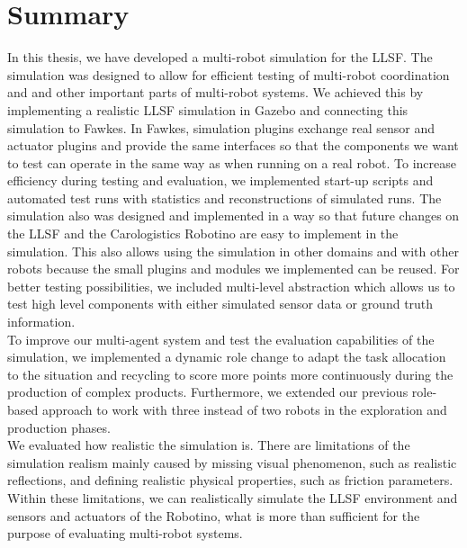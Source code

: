 \section{Summary}
\label{sec:summery}
In this thesis, we have developed a multi-robot simulation for the LLSF. The simulation was designed to allow for efficient testing of multi-robot coordination and and other important parts of multi-robot systems. We achieved this by implementing a realistic LLSF simulation in Gazebo and connecting this simulation to Fawkes. In Fawkes, simulation plugins exchange real sensor and actuator plugins and provide the same interfaces so that the components we want to test can operate in the same way as when running on a real robot. To increase efficiency during testing and evaluation, we implemented start-up scripts and automated test runs with statistics and reconstructions of simulated runs. The simulation also was designed and implemented in a way so that future changes on the LLSF and the Carologistics Robotino are easy to implement in the simulation. This also allows using the simulation in other domains and with other robots because the small plugins and modules we implemented can be reused. For better testing possibilities, we included multi-level abstraction which allows us to test high level components with either simulated sensor data or ground truth information. \\
To improve our multi-agent system and test the evaluation capabilities of the simulation, we implemented a dynamic role change to adapt the task allocation to the situation and recycling to score more points more continuously during the production of complex products. Furthermore, we extended our previous role-based approach to work with three instead of two robots in the exploration and production phases.\\
We evaluated how realistic the simulation is. There are limitations of the simulation realism mainly caused by missing visual phenomenon, such as realistic reflections, and defining realistic physical properties, such as friction parameters. Within these limitations, we can realistically simulate the LLSF environment and sensors and actuators of the Robotino, what is more than sufficient for the purpose of evaluating multi-robot systems.\\
